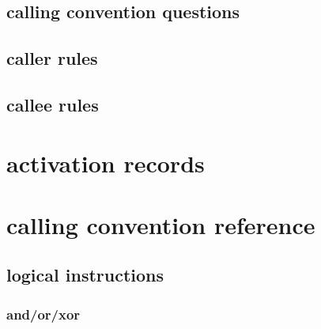 


\subsection{calling convention questions}


\subsection{caller rules}




\subsection{callee rules}

%


%











\section{activation records}


\section{calling convention reference}



\subsection{logical instructions}

\subsubsection{and/or/xor}



